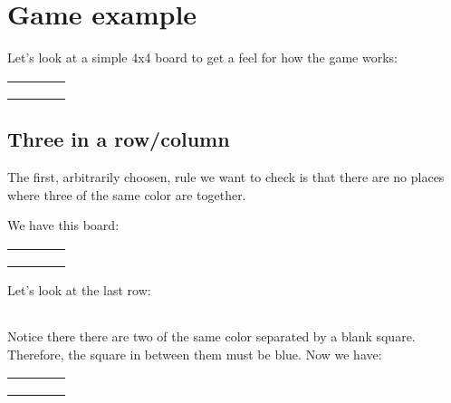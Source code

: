 \documentclass{article}
\begin{document}
\section{Game example}
Let's look at a simple 4x4 board to get a feel for how the game works:
\begin{center}
\begin{tabular}{|l|l|l|l|}
\hline
\cellcolor{blue} & & & 				\\ \hline
 & \cellcolor{red} & & 				\\ \hline
 & & & 						\\ \hline
 & \cellcolor{red} & & \cellcolor{red} 	\\ \hline
\end{tabular}
\end{center}

\subsection{Three in a row/column}
The first, arbitrarily choosen, rule we want to check is that there are no places where 
three of the same color are together.

We have this board:
\begin{center}
\begin{tabular}{|l|l|l|l|}
\hline
\cellcolor{blue} & & & 				\\ \hline
 & \cellcolor{red} & & 				\\ \hline
 & & & 						\\ \hline
 & \cellcolor{red} & & \cellcolor{red} 	\\ \hline
\end{tabular}
\end{center}

Let's look at the last row:
\begin{center}
\begin{tabular}{|l|l|l|l|}
\hline
 & \cellcolor{red} & & \cellcolor{red}	 \\ \hline
\end{tabular}
\end{center}

Notice there there are two of the same color separated by a blank square.
Therefore, the square in between them must be blue. Now we have:

\begin{center}
\begin{tabular}{|l|l|l|l|}
\hline
\cellcolor{blue} & & & 							\\ \hline
 & \cellcolor{red} & & 							\\ \hline
 & & & 									\\ \hline
 & \cellcolor{red} & \cellcolor{blue} & \cellcolor{red} 	\\ \hline
\end{tabular}
\end{center}
\end{document}
